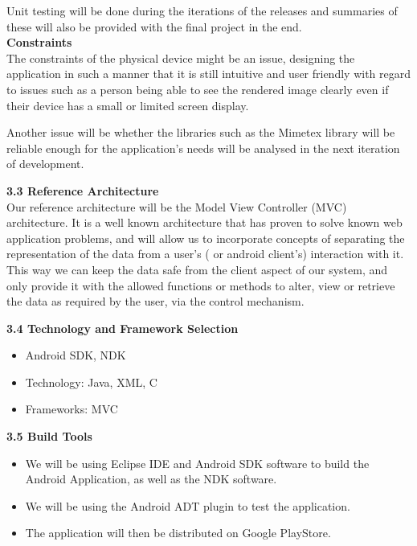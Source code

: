 \documentclass[29pt,a4paper]{moderncv}
\begin{document}
				Unit testing will be done during the iterations of the releases and summaries of these will also be provided with the final project in the end.\\
				
			
			\noindent\textbf{Constraints}
				\\The constraints of the physical device might be an issue, designing the application in such a manner that it is still intuitive and user friendly with regard to issues such as a person being able to see the rendered image clearly even if their device has a small or limited screen display.
				
				Another issue will be whether the libraries such as the Mimetex library will be reliable enough for the application’s needs will be analysed in the next iteration of development.
		\vspace{5mm}
		
		\noindent \textbf{3.3 Reference Architecture}
			\\Our reference architecture will be the Model View Controller (MVC) architecture. It is a well known architecture that has proven to solve known web application problems, and will allow us to incorporate concepts of separating the representation of the data from a user’s ( or android client’s) interaction with it.  This way we can keep the data safe from the client aspect of our system, and only provide it with the allowed functions or methods to alter, view or retrieve the data as required by the user, via the control mechanism.
		\vspace{5mm}
		
		\noindent \textbf{3.4 Technology and Framework Selection}
			\begin{itemize}
				\item Android SDK, NDK
				\item Technology: Java, XML, C
				\item Frameworks: MVC
			\end{itemize}
		\vspace{5mm}
		
		\noindent \textbf{3.5 Build Tools}
			\begin{itemize}
				\item We will be using Eclipse IDE and Android SDK software to build the Android Application, as well as the NDK software.
				\item We will be using the Android ADT plugin to test the application. 
				\item The application will then be distributed on Google PlayStore.
				
			\end{itemize}
		\vspace{5mm}
	\vspace{5mm}	
\newpage
\end{document}
